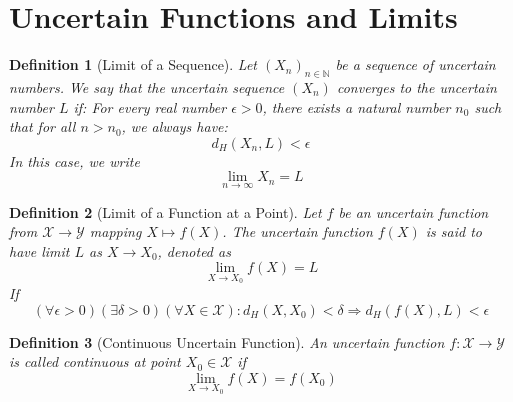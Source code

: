 \documentclass[a4paper,12pt,twoside]{memoir}
\newtheorem{definition}{Definition}[chapter]
\begin{document}
	\section{Uncertain Functions and Limits}
	
	\begin{definition}[Limit of a Sequence]
		Let $(X_n)_{n \in \mathbb{N}}$ be a sequence of uncertain numbers.
		We say that the uncertain sequence $(X_n)$ converges to the uncertain number $L$ if:
		For every real number $\epsilon > 0$, there exists a natural number $n_0$ such that for all $n > n_0$, we always have:
		$$d_H(X_n, L) < \epsilon$$
		In this case, we write \[\lim_{n \to \infty} X_n = L\]
	\end{definition}
	
	\begin{definition}[Limit of a Function at a Point]
		Let $f$ be an uncertain function from $\mathcal{X} \rightarrow \mathcal{Y}$ mapping $X \mapsto f(X)$. The uncertain function $f(X)$ is said to have limit $L$ as $X \rightarrow X_0$, denoted as
		$$\lim\limits_{X \rightarrow X_0}f(X) = L$$
		If $$(\forall \epsilon >0)(\exists \delta >0)(\forall X \in \mathcal{X}) : d_H(X,X_0)<\delta \Rightarrow d_H(f(X),L) < \epsilon$$
	\end{definition}
	
	\begin{definition}[Continuous Uncertain Function]
		An uncertain function $f : \mathcal{X} \to \mathcal{Y}$ is called continuous at point $X_0 \in \mathcal{X}$ if
		$$\lim\limits_{X \rightarrow X_0}f(X) = f(X_0)$$
	\end{definition}
	
\end{document}
